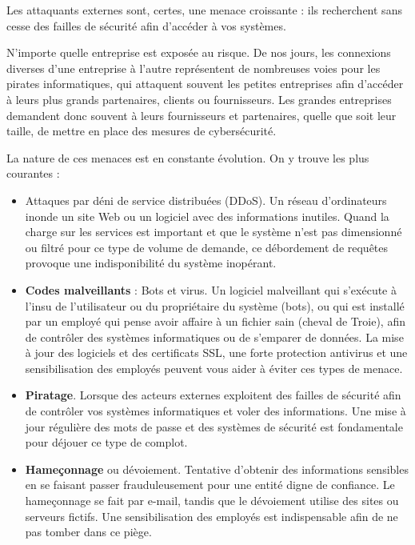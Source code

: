Les attaquants externes sont, certes, une menace croissante : ils recherchent sans cesse des failles de sécurité afin d’accéder à vos systèmes.

N’importe quelle entreprise est exposée au risque. De nos jours, les connexions diverses d’une entreprise à l’autre représentent de nombreuses voies pour les pirates informatiques, qui attaquent souvent les petites entreprises afin d’accéder à leurs plus grands partenaires, clients ou fournisseurs. Les grandes entreprises demandent donc souvent à leurs fournisseurs et partenaires, quelle que soit leur taille, de mettre en place des mesures de cybersécurité.





La nature de ces menaces est en constante évolution.  On y trouve les plus courantes :

\begin{itemize}

\item Attaques par déni de service distribuées (DDoS). Un réseau d’ordinateurs inonde un site Web ou un logiciel avec des informations inutiles. Quand la charge sur les services est important et que le système n'est pas dimensionné ou filtré pour ce type de volume de demande, ce débordement de requêtes provoque une indisponibilité du système inopérant. 

\item \textbf{Codes malveillants} : Bots et virus. Un logiciel malveillant qui s’exécute à l'insu de l'utilisateur ou du propriétaire du système (bots), ou qui est installé par un employé qui pense avoir affaire à un fichier sain (cheval de Troie), afin de contrôler des systèmes informatiques ou de s’emparer de données. La mise à jour des logiciels et des certificats SSL, une forte protection antivirus et une sensibilisation des employés peuvent vous aider à éviter ces types de menace.

\item \textbf{Piratage}. Lorsque des acteurs externes exploitent des failles de sécurité afin de contrôler vos systèmes informatiques et voler des informations. Une mise à jour régulière des mots de passe et des systèmes de sécurité est fondamentale pour déjouer ce type de complot.

\item \textbf{Hameçonnage} ou dévoiement. Tentative d’obtenir des informations sensibles en se faisant passer frauduleusement pour une entité digne de confiance. Le hameçonnage se fait par e-mail, tandis que le dévoiement utilise des sites ou serveurs fictifs. Une sensibilisation des employés est indispensable afin de ne pas tomber dans ce piège.

\end{itemize}


